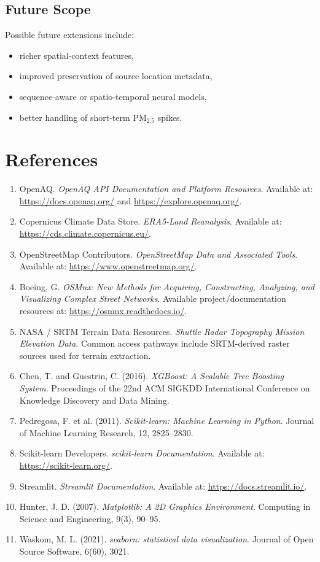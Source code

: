 \documentclass[12pt,a4paper]{report}
\begin{document}
\section{Future Scope}
Possible future extensions include:

\begin{itemize}[leftmargin=1.3cm]
    \item richer spatial-context features,
    \item improved preservation of source location metadata,
    \item sequence-aware or spatio-temporal neural models,
    \item better handling of short-term PM$_{2.5}$ spikes.
\end{itemize}

\chapter*{References}

\begin{enumerate}[leftmargin=1.0cm]
    \item OpenAQ. \textit{OpenAQ API Documentation and Platform Resources}. Available at: \url{https://docs.openaq.org/} and \url{https://explore.openaq.org/}.
    \item Copernicus Climate Data Store. \textit{ERA5-Land Reanalysis}. Available at: \url{https://cds.climate.copernicus.eu/}.
    \item OpenStreetMap Contributors. \textit{OpenStreetMap Data and Associated Tools}. Available at: \url{https://www.openstreetmap.org/}.
    \item Boeing, G. \textit{OSMnx: New Methods for Acquiring, Constructing, Analyzing, and Visualizing Complex Street Networks}. Available project/documentation resources at: \url{https://osmnx.readthedocs.io/}.
    \item NASA / SRTM Terrain Data Resources. \textit{Shuttle Radar Topography Mission Elevation Data}. Common access pathways include SRTM-derived raster sources used for terrain extraction.
    \item Chen, T. and Guestrin, C. (2016). \textit{XGBoost: A Scalable Tree Boosting System}. Proceedings of the 22nd ACM SIGKDD International Conference on Knowledge Discovery and Data Mining.
    \item Pedregosa, F. et al. (2011). \textit{Scikit-learn: Machine Learning in Python}. Journal of Machine Learning Research, 12, 2825--2830.
    \item Scikit-learn Developers. \textit{scikit-learn Documentation}. Available at: \url{https://scikit-learn.org/}.
    \item Streamlit. \textit{Streamlit Documentation}. Available at: \url{https://docs.streamlit.io/}.
    \item Hunter, J. D. (2007). \textit{Matplotlib: A 2D Graphics Environment}. Computing in Science and Engineering, 9(3), 90--95.
    \item Waskom, M. L. (2021). \textit{seaborn: statistical data visualization}. Journal of Open Source Software, 6(60), 3021.
\end{enumerate}
\end{document}
